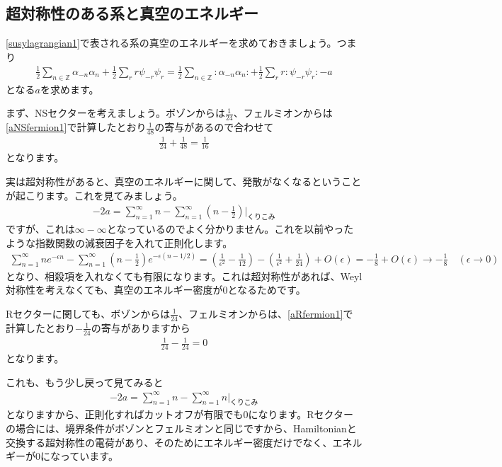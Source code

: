 \documentclass[report,paper=a4, fontsize=12pt, line_length=16cm, number_of_lines=33,dvipdfmx]{jlreq}
\numberwithin{equation}{chapter}
\numberwithin{equation}{section}
\newcommand{\Zb}{\mathbb{Z}}
\begin{document}
\subsection{超対称性のある系と真空のエネルギー}

\eqref{susylagrangian1}で表される系の真空のエネルギーを求めておきましょう。つまり
\begin{align}
  \frac12 \sum_{n\in \Zb}\alpha_{-n}\alpha_{n}+\frac12 \sum_{r}r \psi_{-r}\psi_{r}
  =  \frac12 \sum_{n\in \Zb}:\alpha_{-n}\alpha_{n}:+\frac12 \sum_{r}r :\psi_{-r}\psi_{r}:-a
\end{align}
となる$a$を求めます。

まず、NSセクターを考えましょう。ボゾンからは$\frac{1}{24}$、フェルミオンからは\eqref{aNSfermion1}で計算したとおり$\frac{1}{48}$の寄与があるので合わせて
\begin{align}
  \frac{1}{24}+\frac{1}{48}=\frac{1}{16}\label{supervacuumenergyNS}
\end{align}
となります。

実は超対称性があると、真空のエネルギーに関して、発散がなくなるということが起こります。これを見てみましょう。
\begin{align}
  -2a=\sum_{n=1}^{\infty}n-\sum_{n=1}^{\infty}\left( n-\frac12 \right)　\Bigg|_{\text{くりこみ}}
\end{align}
ですが、これは$\infty-\infty$となっているのでよく分かりません。これを以前やったような指数関数の減衰因子を入れて正則化します。
\begin{align}
  \sum_{n=1}^{\infty}n e^{-\epsilon n}-\sum_{n=1}^{\infty}\left( n-\frac12 \right)e^{-\epsilon (n-1/2)}
  =\left( \frac{1}{\epsilon^2}-\frac{1}{12} \right)-\left( \frac{1}{\epsilon^2}+\frac{1}{24} \right)+O(\epsilon)
  =-\frac{1}{8}+O(\epsilon)\to -\frac{1}{8}\quad (\epsilon\to 0)
\end{align}
となり、相殺項を入れなくても有限になります。これは超対称性があれば、Weyl対称性を考えなくても、真空のエネルギー密度が$0$となるためです。

Rセクターに関しても、ボゾンからは$\frac{1}{24}$、フェルミオンからは、\eqref{aRfermion1}で計算したとおり$-\frac{1}{24}$の寄与がありますから
\begin{align}
  \frac{1}{24}-\frac{1}{24}=0\label{supervacuumenergyR}
\end{align}
となります。

これも、もう少し戻って見てみると
\begin{align}
  -2a=\sum_{n=1}^{\infty}n-\sum_{n=1}^{\infty}n　\Bigg|_{\text{くりこみ}}
\end{align}
となりますから、正則化すればカットオフが有限でも$0$になります。Rセクターの場合には、境界条件がボゾンとフェルミオンと同じですから、Hamiltonianと交換する超対称性の電荷があり、そのためにエネルギー密度だけでなく、エネルギーが$0$になっています。
\end{document}
